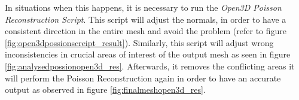 \documentclass[12pt]{report}
\begin{document}
In situations when this happens, it is necessary to run the \textit{Open3D Poisson Reconstruction Script}.
This script will adjust the normals, in order to have a consistent direction in the entire mesh and avoid the problem (refer to figure \ref{fig:open3dpossionscreipt_result}).
Similarly, this script will adjust wrong inconsistencies in crucial areas of interest of the output mesh as seen in figure \ref{fig:analysedpossionopen3d_res}. 
Afterwards, it removes the conflicting areas it will perform the Poisson Reconstruction again in order to have an accurate output as observed in figure \ref{fig:finalmeshopen3d_res}.

\begin{figure}[H]%
  \centering
 
  \qquad
  \qquad

\end{figure}
\end{document}
